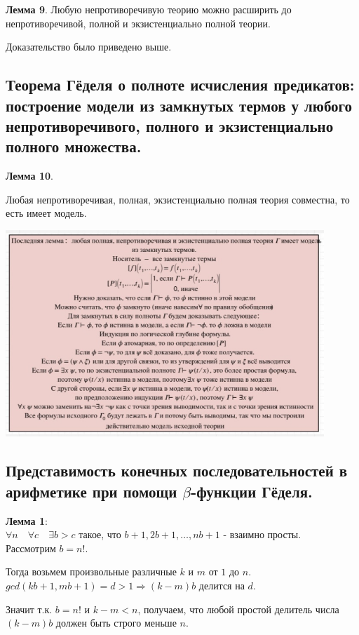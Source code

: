 \textbf{Лемма 9}.
Любую непротиворечивую теорию можно расширить до непротиворечивой, полной и экзистенциально полной теории.

Доказательство было приведено выше.

\subsection{Теорема Гёделя о полноте исчисления предикатов: построение модели из замкнутых термов у любого непротиворечивого, полного и экзистенциально полного множества.}

\textbf{Лемма 10}.

Любая непротиворечивая, полная, экзистенциально полная теория совместна, то есть имеет модель.
\begin{center}
    \includegraphics[width=12cm]{images/1.5_full2}    
\end{center}

\subsection{Представимость конечных последовательностей в арифметике при помощи $\beta$-функции Гёделя.}

\textbf{Лемма 1}:\\

$\forall n \quad \forall c \quad \exists b > c$ такое, что $b + 1,  2b + 1, \dotsc, nb + 1$ - взаимно просты.\\

Рассмотрим $b = n!$.

Тогда возьмем произвольные различные $k$ и $m$ от $1$ до $n$. $gcd(kb + 1, mb + 1) = d > 1 \Rightarrow (k - m)b$ делится на $d$.

Значит т.к. $b = n!$ и $k - m < n$, получаем, что любой простой делитель числа $(k - m)b$ должен быть строго меньше $n$.\\

